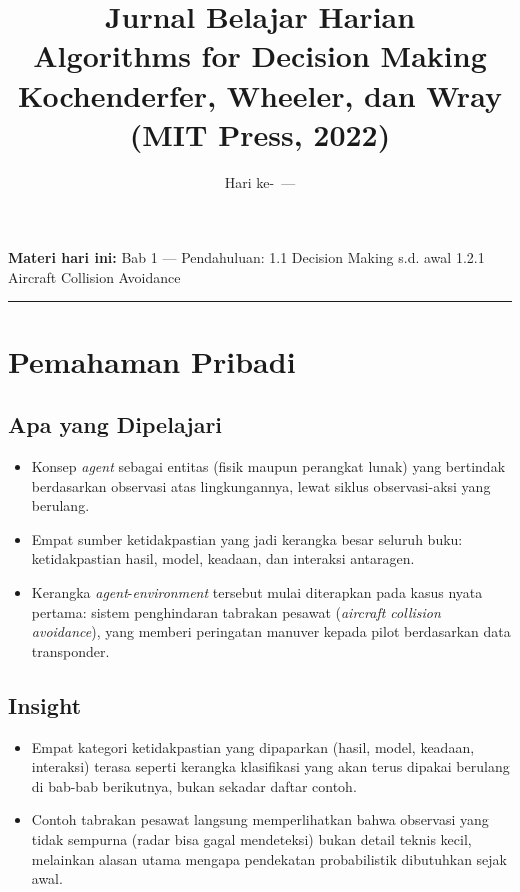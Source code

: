 \documentclass[12pt,a4paper]{article}
\title{\textbf{Jurnal Belajar Harian} \\ \large Algorithms for Decision Making \\ \normalsize Kochenderfer, Wheeler, dan Wray (MIT Press, 2022)}
\author{}
\date{Hari ke-\harike\ --- \tanggalentri}
\newcommand{\babyangdibahas}{Bab 1 --- Pendahuluan: 1.1 Decision Making s.d. awal 1.2.1 Aircraft Collision Avoidance}
\begin{document}
\maketitle
\thispagestyle{fancy}

\noindent\textbf{Materi hari ini:} \babyangdibahas

\vspace{0.5cm}
\hrule
\vspace{0.5cm}

\section{Pemahaman Pribadi}

\subsection{Apa yang Dipelajari}
\begin{itemize}[leftmargin=1.2cm]
    \item Konsep \textit{agent} sebagai entitas (fisik maupun perangkat lunak) yang bertindak berdasarkan observasi atas lingkungannya, lewat siklus observasi-aksi yang berulang.
    \item Empat sumber ketidakpastian yang jadi kerangka besar seluruh buku: ketidakpastian hasil, model, keadaan, dan interaksi antaragen.
    \item Kerangka \textit{agent}-\textit{environment} tersebut mulai diterapkan pada kasus nyata pertama: sistem penghindaran tabrakan pesawat (\textit{aircraft collision avoidance}), yang memberi peringatan manuver kepada pilot berdasarkan data transponder.
\end{itemize}

\subsection{Insight}
\begin{itemize}[leftmargin=1.2cm]
    \item Empat kategori ketidakpastian yang dipaparkan (hasil, model, keadaan, interaksi) terasa seperti kerangka klasifikasi yang akan terus dipakai berulang di bab-bab berikutnya, bukan sekadar daftar contoh.
    \item Contoh tabrakan pesawat langsung memperlihatkan bahwa observasi yang tidak sempurna (radar bisa gagal mendeteksi) bukan detail teknis kecil, melainkan alasan utama mengapa pendekatan probabilistik dibutuhkan sejak awal.
\end{itemize}
\end{document}
